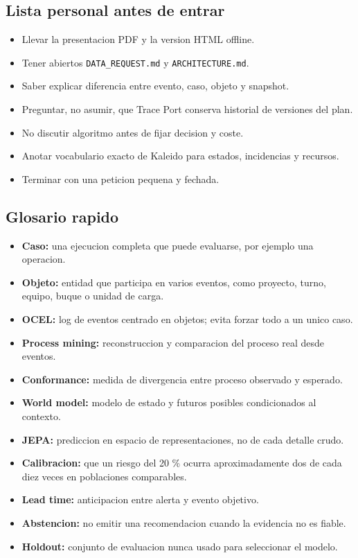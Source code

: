 \documentclass[
  spanish,
  10pt,
  a4paper,
]{article}
\providecommand{\tightlist}{%
  \setlength{\itemsep}{0pt}\setlength{\parskip}{0pt}}
\begin{document}
\subsection{Lista personal antes de
entrar}\label{lista-personal-antes-de-entrar}

\begin{itemize}
\tightlist
\item
  Llevar la presentacion PDF y la version HTML offline.
\item
  Tener abiertos \texttt{DATA\_REQUEST.md} y \texttt{ARCHITECTURE.md}.
\item
  Saber explicar diferencia entre evento, caso, objeto y snapshot.
\item
  Preguntar, no asumir, que Trace Port conserva historial de versiones
  del plan.
\item
  No discutir algoritmo antes de fijar decision y coste.
\item
  Anotar vocabulario exacto de Kaleido para estados, incidencias y
  recursos.
\item
  Terminar con una peticion pequena y fechada.
\end{itemize}

\subsection{Glosario rapido}\label{glosario-rapido}

\begin{itemize}
\tightlist
\item
  \textbf{Caso:} una ejecucion completa que puede evaluarse, por ejemplo
  una operacion.
\item
  \textbf{Objeto:} entidad que participa en varios eventos, como
  proyecto, turno, equipo, buque o unidad de carga.
\item
  \textbf{OCEL:} log de eventos centrado en objetos; evita forzar todo a
  un unico caso.
\item
  \textbf{Process mining:} reconstruccion y comparacion del proceso real
  desde eventos.
\item
  \textbf{Conformance:} medida de divergencia entre proceso observado y
  esperado.
\item
  \textbf{World model:} modelo de estado y futuros posibles
  condicionados al contexto.
\item
  \textbf{JEPA:} prediccion en espacio de representaciones, no de cada
  detalle crudo.
\item
  \textbf{Calibracion:} que un riesgo del 20 \% ocurra aproximadamente
  dos de cada diez veces en poblaciones comparables.
\item
  \textbf{Lead time:} anticipacion entre alerta y evento objetivo.
\item
  \textbf{Abstencion:} no emitir una recomendacion cuando la evidencia
  no es fiable.
\item
  \textbf{Holdout:} conjunto de evaluacion nunca usado para seleccionar
  el modelo.
\end{itemize}
\end{document}
